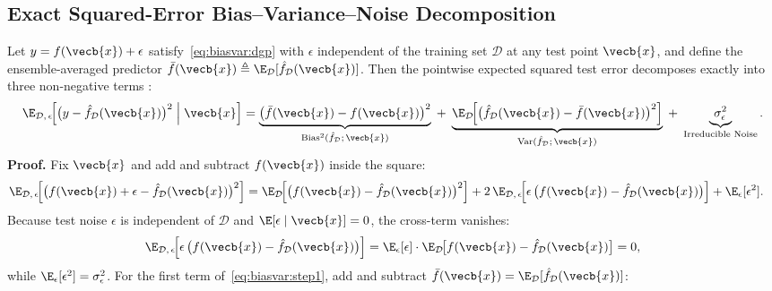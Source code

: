 \documentclass[../../../../master.tex]{subfiles}
\begin{document}
\subsection{Exact Squared-Error Bias--Variance--Noise Decomposition}

\begin{coremath}
\label{thm:biasvar:decomp}
Let $y = f(\vecb{x}) + \epsilon$ satisfy~\eqref{eq:biasvar:dgp} with $\epsilon$ independent of the training set $\mathcal{D}$ at any test point $\vecb{x}$, and define the ensemble-averaged predictor $\bar{f}(\vecb{x}) \triangleq \E_{\mathcal{D}}[\hat{f}_{\mathcal{D}}(\vecb{x})]$. Then the pointwise expected squared test error decomposes exactly into three non-negative terms  :
\begin{equation}
  \E_{\mathcal{D},\, \epsilon}\!\Big[\big(y - \hat{f}_{\mathcal{D}}(\vecb{x})\big)^2 \;\Big|\; \vecb{x}\Big]
  = \underbrace{\big(\bar{f}(\vecb{x}) - f(\vecb{x})\big)^2}_{\mathrm{Bias}^2(\hat{f}_{\mathcal{D}};\, \vecb{x})}
  \;+\; \underbrace{\E_{\mathcal{D}}\!\Big[\big(\hat{f}_{\mathcal{D}}(\vecb{x}) - \bar{f}(\vecb{x})\big)^2\Big]}_{\mathrm{Var}(\hat{f}_{\mathcal{D}};\, \vecb{x})}
  \;+\; \underbrace{\sigma_\epsilon^2}_{\text{Irreducible Noise}}.
  \label{eq:biasvar:pointwise_bv}
\end{equation}
\textbf{Proof.} Fix $\vecb{x}$ and add and subtract $f(\vecb{x})$ inside the square:
\begin{align}
  \E_{\mathcal{D},\, \epsilon}\!\Big[\big(f(\vecb{x}) + \epsilon - \hat{f}_{\mathcal{D}}(\vecb{x})\big)^2\Big]
  &= \E_{\mathcal{D}}\!\Big[\big(f(\vecb{x}) - \hat{f}_{\mathcal{D}}(\vecb{x})\big)^2\Big]
   + 2\,\E_{\mathcal{D},\, \epsilon}\!\Big[\epsilon\,\big(f(\vecb{x}) - \hat{f}_{\mathcal{D}}(\vecb{x})\big)\Big]
   + \E_{\epsilon}[\epsilon^2]. \label{eq:biasvar:step1}
\end{align}
Because test noise $\epsilon$ is independent of $\mathcal{D}$ and $\E[\epsilon \mid \vecb{x}] = 0$, the cross-term vanishes:
\[
  \E_{\mathcal{D},\, \epsilon}\!\Big[\epsilon\,\big(f(\vecb{x}) - \hat{f}_{\mathcal{D}}(\vecb{x})\big)\Big]
  = \E_{\epsilon}[\epsilon] \cdot \E_{\mathcal{D}}\!\big[f(\vecb{x}) - \hat{f}_{\mathcal{D}}(\vecb{x})\big] = 0,
\]
while $\E_{\epsilon}[\epsilon^2] = \sigma_\epsilon^2$. For the first term of~\eqref{eq:biasvar:step1}, add and subtract $\bar{f}(\vecb{x}) = \E_{\mathcal{D}}[\hat{f}_{\mathcal{D}}(\vecb{x})]$:

\end{coremath}
\end{document}
